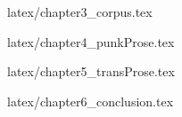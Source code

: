 \documentclass[12pt, a4paper,twoside]{tesi_upf}
\begin{document}
 {latex/chapter3_corpus.tex}
\newpage\leavevmode\thispagestyle{empty}\newpage

 {latex/chapter4_punkProse.tex}
\newpage\leavevmode\thispagestyle{empty}\newpage

 {latex/chapter5_transProse.tex}
\newpage\leavevmode\thispagestyle{empty}\newpage

 {latex/chapter6_conclusion.tex}
\newpage\leavevmode\thispagestyle{empty}\newpage





\printindex


\end{document}
